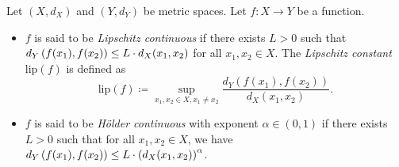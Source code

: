 \documentclass[screen,single]{techreport}
\numberwithin{equation}{section}
\begin{document}
\begin{definition}\label{De:LipschitzHolder}
  Let $(X,d_X)$ and $(Y,d_Y)$ be metric spaces.
  Let $f : X \to Y$ be a function.
  \begin{itemize}
    \item $f$ is said to be \emph{Lipschitz continuous} if there exists $L > 0$ such that $d_Y\left({f(x_1),f(x_2)}\right) \le L \cdot d_X(x_1,x_2)$ for all $x_1,x_2 \in X$.
    The \emph{Lipschitz constant} $\mathrm{lip}(f)$ is defined as
    \[
    \mathrm{lip}(f) \coloneqq \sup_{x_1,x_2 \in X, x_1 \neq x_2} \frac{d_Y(f(x_1),f(x_2))}{d_X(x_1,x_2)}.
    \]
    \item $f$ is said to be \emph{H{\"o}lder continuous} with exponent $\alpha \in (0,1)$ if there exists $L > 0$ such that for all $x_1,x_2 \in X$, we have $d_Y\left({f(x_1),f(x_2)}\right) \le L \cdot \left({d_X(x_1,x_2)}\right)^\alpha$.
  \end{itemize}
\end{definition}



\end{document}
